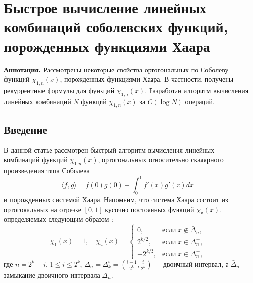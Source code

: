 \section{Быстрое вычисление линейных комбинаций соболевских функций, порожденных функциями Хаара}

\textbf{Аннотация.} Рассмотрены некоторые свойства ортогональных по Соболеву функций $\chi_{1,n}(x)$, порожденных функциями Хаара. В частности, получены рекуррентные формулы для функций $\chi_{1,n}(x)$. Разработан алгоритм вычисления линейных комбинаций $N$ функций $\chi_{1,n}(x)$ за $O(\log N)$ операций.

\subsection{Введение}

В данной статье рассмотрен быстрый алгоритм вычисления линейных комбинаций  функций $\chi_{1,n}(x)$, ортогональных относительно скалярного произведения типа Соболева
\begin{equation}\label{mmgmsr1-inner-prod}
\langle f,g \rangle =
f(0)g(0)+\int_{0}^{1}f'(x)g'(x)dx
\end{equation}
и порожденных системой Хаара. Напомним, что система Хаара состоит из ортогональных на отрезке $[0,1]$ кусочно постоянных функций $\chi_n(x)$, определяемых следующим образом \cite[глава 3, с. 70]{mmgmsr1-Kashin}:
\begin{equation}\label{mmgmsr1-haar-def}
\chi_1(x)=1, \quad
\chi_n(x)=\begin{cases} 0,&\text{если $x\notin \bar\Delta_n$,}\\
2^{k/2},& \text{если $x\in \Delta_n^+$,}\\
-2^{k/2},& \text{если $x\in \Delta_n^-$,}
\end{cases}
\end{equation}
где $n=2^k+i$, $1 \le i \le 2^k$, $\Delta_n=\Delta_k^i=(\frac{i-1}{2^k},\frac{i}{2^k})$ --- двоичный интервал, а $\bar\Delta_n$ --- замыкание двоичного интервала $\Delta_n$.

